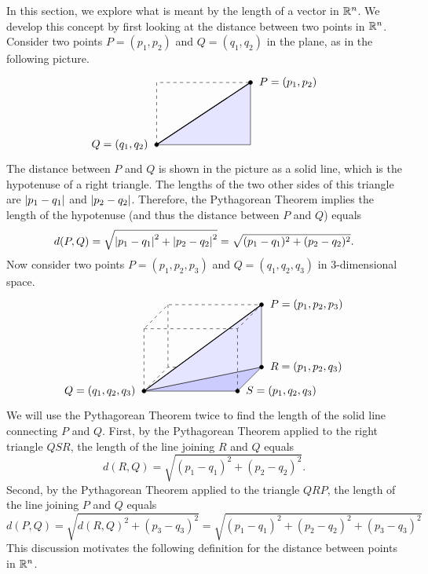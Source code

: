 In this section, we explore what is meant by the length of a vector in
$\mathbb{R}^n$.  We develop this concept by first looking at the distance
between two points in $\mathbb{R}^n$. Consider two points $P=(p_1,p_2)$ and
$Q=(q_1,q_2)$ in the plane, as in the following picture.
\begin{equation*}
  \begin{tikzpicture}[scale=1]
    \draw[dashed] (0,0) -- (0,2) -- (3,2);
    \draw[fill=blue!10] (0,0) -- (3,0) -- (3,2) -- cycle;
    \draw[thick] (0,0) -- (3,2);
    \draw[fill](0,0) circle [radius=1.8pt] node[left=1ex]{$Q=(q_1,q_2)$};
    \draw[fill](3,2) circle [radius=1.8pt] node[right=1ex]{$P=(p_1,p_2)$};
  \end{tikzpicture}
\end{equation*}
The distance between $P$ and $Q$ is shown in the picture as a solid
line, which is the hypotenuse of a right triangle.  The lengths of the
two other sides of this triangle are $\left|p_{1}-q_{1}\right| $ and
$\left|p_{2}-q_{2}\right|$. Therefore, the Pythagorean Theorem implies the
length of the hypotenuse (and thus the distance between $P$ and $Q$)
equals
\begin{equation*}
  d(P,Q)
  =\sqrt{\left|p_{1}-q_{1}\right|^{2}+\left|p_{2}-q_{2}\right|^{2}}
  =\sqrt{(p_{1}-q_{1})^{2}+(p_{2}-q_{2})^{2}}.
\end{equation*}
Now consider two points $P=(p_{1},p_{2},p_{3})$ and
$Q = (q_{1},q_{2},q_{3})$ in $3$-dimensional space.
\begin{equation*}
  \begin{tikzpicture}[scale=1]
    \draw[dashed] (3,0,-2) -- (0,0,-2) -- (0,0,0);
    \draw[dashed] (0,0,0) -- (0,2,0);
    \draw[dashed] (0,0,-2) -- (0,2,-2);
    \draw[fill=blue!20] (0,0,0) -- (3,0,0) -- (3,0,-2) -- cycle;
    \draw[fill=blue!10] (0,0,0) -- (3,0,-2) -- (3,2,-2) -- cycle;
    \draw[dashed] (0,2,0) -- (3,2,0) -- (3,2,-2) -- (0,2,-2) -- cycle;
    \draw[dashed] (3,0,0) -- (3,2,0);
    \draw[thick] (0,0,0) -- (3,2,-2);
    \draw[fill](0,0,0) circle [radius=1.8pt] node[left=1ex]{$Q=(q_1,q_2,q_3)$};
    \draw[fill](3,2,-2) circle [radius=1.8pt] node[right=1ex]{$P=(p_1,p_2,p_3)$};
    \draw[fill](3,0,-2) circle [radius=1.8pt] node[right=1ex]{$R=(p_1,p_2,q_3)$};
    \draw[fill](3,0,0) circle [radius=1.8pt] node[right=1ex]{$S=(p_1,q_2,q_3)$};
  \end{tikzpicture}
\end{equation*}
We will use the Pythagorean Theorem twice to find the length of the
solid line connecting $P$ and $Q$. First, by the Pythagorean Theorem
applied to the right triangle $QSR$, the length of the line joining
$R$ and $Q$ equals
\begin{equation*}
d(R,Q) = \sqrt{ (p_{1}-q_{1}) ^{2}+(p_{2}-q_{2}) ^{2}}.
\end{equation*}
Second, by the Pythagorean Theorem applied to the triangle $QRP$, the
length of the line joining $P$ and $Q$ equals
\begin{equation*}
d(P,Q)=\sqrt{d(R,Q)^{2}+(p_{3}-q_{3})^{2}}
 =\sqrt{ (p_{1}-q_{1})^{2}+(p_{2}-q_{2})^{2}+(p_{3}-q_{3})^{2}}
\end{equation*}
This discussion motivates the following definition for the distance
between points in $\mathbb{R}^n$.

